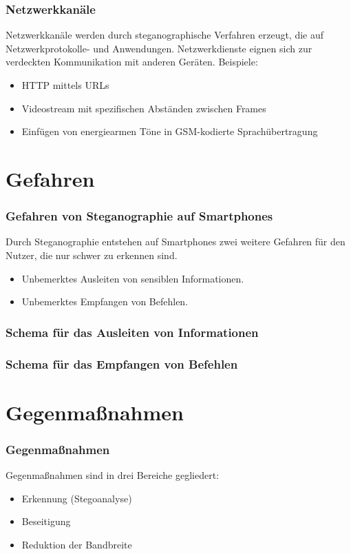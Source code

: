 \documentclass{beamer}
\begin{document}
\begin{frame}
  \frametitle{Netzwerkkanäle}
  Netzwerkkanäle werden durch steganographische Verfahren erzeugt, die auf Netzwerkprotokolle- und Anwendungen.
  Netzwerkdienste eignen sich zur verdeckten Kommunikation mit anderen Geräten.
  Beispiele:
  \begin{itemize}
    \item HTTP mittels URLs
    \item Videostream mit spezifischen Abständen zwischen Frames
    \item Einfügen von energiearmen Töne in GSM-kodierte Sprachübertragung
  \end{itemize}
\end{frame}

\section{Gefahren}
\begin{frame}
  \frametitle{Gefahren von Steganographie auf Smartphones}
  Durch Steganographie entstehen auf Smartphones zwei weitere Gefahren für den Nutzer, die nur schwer zu erkennen sind.
  \begin{itemize}
    \item Unbemerktes Ausleiten von sensiblen Informationen.
    \item Unbemerktes Empfangen von Befehlen.
  \end{itemize}
\end{frame}

\begin{frame}
  \frametitle{Schema für das Ausleiten von Informationen}
  \centering
    \def\svgwidth{8cm}
    
\end{frame}

\begin{frame}
  \frametitle{Schema für das Empfangen von Befehlen}
  \centering
    \def\svgwidth{\columnwidth}
    
\end{frame}

\section{Gegenmaßnahmen}

\begin{frame}
\frametitle{Gegenmaßnahmen}  
Gegenmaßnahmen sind in drei Bereiche gegliedert:
\begin{itemize}
  \item Erkennung (Stegoanalyse)
  \item Beseitigung
  \item Reduktion der Bandbreite
\end{itemize}
\end{frame}
\end{document}
